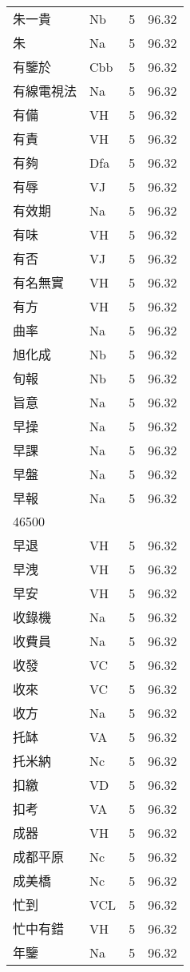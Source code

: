 \documentclass[twocolumn]{book}
\begin{document}
\begin{supertabular}{llrr}
朱一貴 & Nb & 5 &  96.32\\
朱 & Na & 5 &  96.32\\
有鑒於 & Cbb & 5 &  96.32\\
有線電視法 & Na & 5 &  96.32\\
有備 & VH & 5 &  96.32\\
有責 & VH & 5 &  96.32\\
有夠 & Dfa & 5 &  96.32\\
有辱 & VJ & 5 &  96.32\\
有效期 & Na & 5 &  96.32\\
有味 & VH & 5 &  96.32\\
有否 & VJ & 5 &  96.32\\
有名無實 & VH & 5 &  96.32\\
有方 & VH & 5 &  96.32\\
曲率 & Na & 5 &  96.32\\
旭化成 & Nb & 5 &  96.32\\
旬報 & Nb & 5 &  96.32\\
旨意 & Na & 5 &  96.32\\
早操 & Na & 5 &  96.32\\
早課 & Na & 5 &  96.32\\
早盤 & Na & 5 &  96.32\\
早報 & Na & 5 &  96.32\\
46500\\
早退 & VH & 5 &  96.32\\
早洩 & VH & 5 &  96.32\\
早安 & VH & 5 &  96.32\\
收錄機 & Na & 5 &  96.32\\
收費員 & Na & 5 &  96.32\\
收發 & VC & 5 &  96.32\\
收來 & VC & 5 &  96.32\\
收方 & Na & 5 &  96.32\\
托缽 & VA & 5 &  96.32\\
托米納 & Nc & 5 &  96.32\\
扣繳 & VD & 5 &  96.32\\
扣考 & VA & 5 &  96.32\\
成器 & VH & 5 &  96.32\\
成都平原 & Nc & 5 &  96.32\\
成美橋 & Nc & 5 &  96.32\\
忙到 & VCL & 5 &  96.32\\
忙中有錯 & VH & 5 &  96.32\\
年鑒 & Na & 5 &  96.32\\

\end{supertabular}
\end{document}
